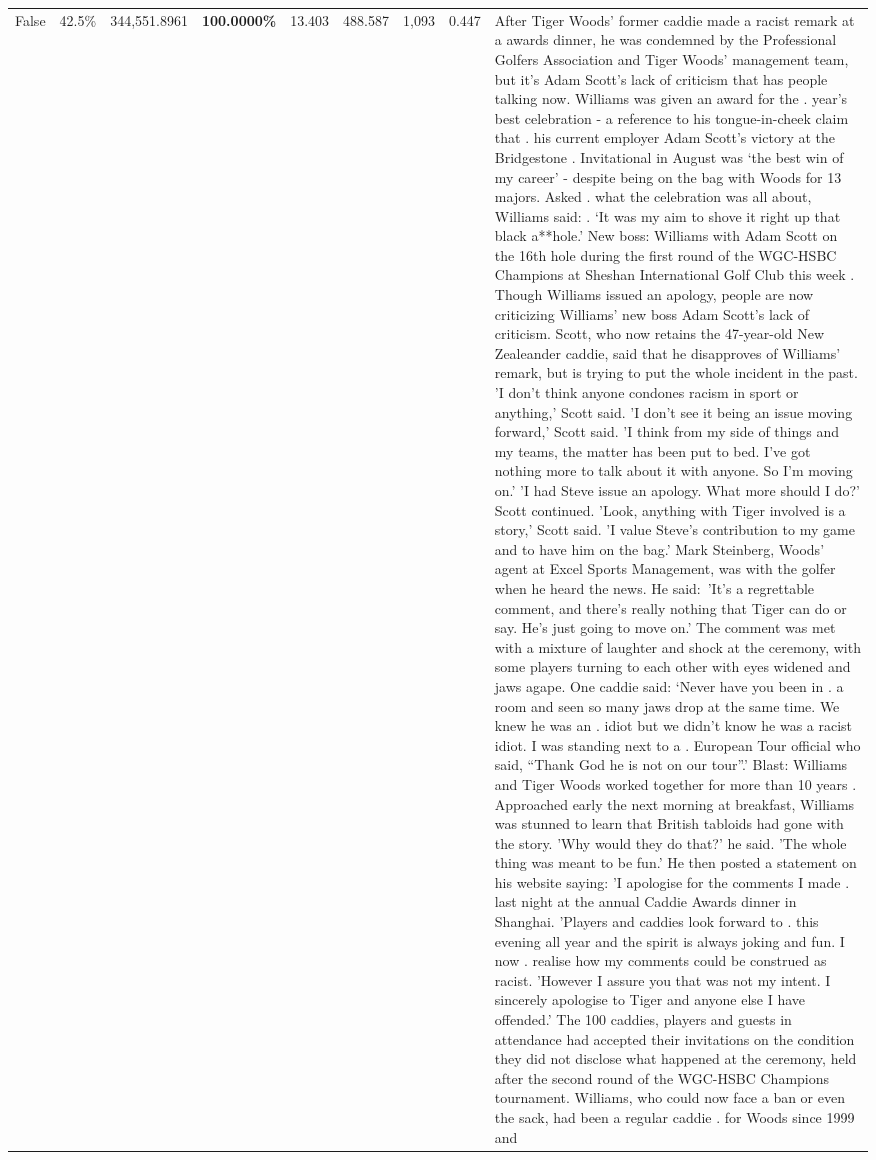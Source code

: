 \begin{table}[H]
\begin{tabular}{lllrlllll}
False & 42.5\% & 344,551.8961 & \bfseries \color{red} 100.0000\% & 13.403 & 488.587 & 1,093 & 0.447 & After Tiger Woods' former caddie made a racist remark at a awards dinner, he was condemned by the Professional Golfers Association and Tiger Woods' management team, but it's Adam Scott's lack of criticism that has people talking now. Williams was given an award for the . year’s best celebration - a reference to his tongue-in-cheek claim that . his current employer Adam Scott’s victory at the Bridgestone . Invitational in August was ‘the best win of my career’ - despite being on the bag with Woods for 13 majors. Asked . what the celebration was all about, Williams said: . ‘It was my aim to shove it right up that black a**hole.’ New boss: Williams with Adam Scott  on the 16th hole during the first round of the WGC-HSBC Champions at Sheshan International Golf Club this week . Though Williams issued an apology, people are now criticizing Williams' new boss Adam Scott's lack of criticism. Scott, who now retains the 47-year-old New Zealeander caddie, said that he disapproves of Williams' remark, but is trying to put the whole incident in the past. 'I don't think anyone condones racism in sport or anything,' Scott said. 'I don't see it being an issue moving forward,' Scott said. 'I think from my side of things and my teams, the matter has been put to bed. I've got nothing more to talk about it with anyone. So I'm moving on.' 'I had Steve issue an apology. What more should I do?' Scott continued. 'Look, anything with Tiger involved is a story,' Scott said. 'I value Steve's contribution to my game and to have him on the bag.' Mark Steinberg, Woods' agent at Excel Sports Management, was with the golfer when he heard the news. He said: 'It's a regrettable comment, and there's really nothing that Tiger can do or say. He's just going to move on.' The comment was met with a mixture of laughter and shock at the ceremony, with some players turning to each other with eyes widened and jaws agape. One caddie said: ‘Never have you been in . a room and seen so many jaws drop at the same time. We knew he was an . idiot but we didn’t know he was a racist idiot. I was standing next to a . European Tour official who said, “Thank God he is not on our tour”.’ Blast: Williams and Tiger Woods worked together for more than 10 years . Approached early the next morning at breakfast, Williams was stunned to learn that British tabloids had gone with the story. 'Why would they do that?' he said. 'The whole thing was meant to be fun.' He then posted a statement on his website saying: 'I apologise for the comments I made . last night at the annual Caddie Awards dinner in Shanghai. 'Players and caddies look forward to . this evening all year and the spirit is always joking and fun. I now . realise how my comments could be construed as racist. 'However I assure you that was not my intent. I sincerely apologise to Tiger and anyone else I have offended.' The 100 caddies, players and guests in attendance had accepted their invitations on the condition they did not disclose what happened at the ceremony, held after the second round of the WGC-HSBC Champions tournament. Williams, who could now face a ban or even the sack, had been a regular caddie . for Woods since 1999 and 
\end{tabular}
\end{table}
